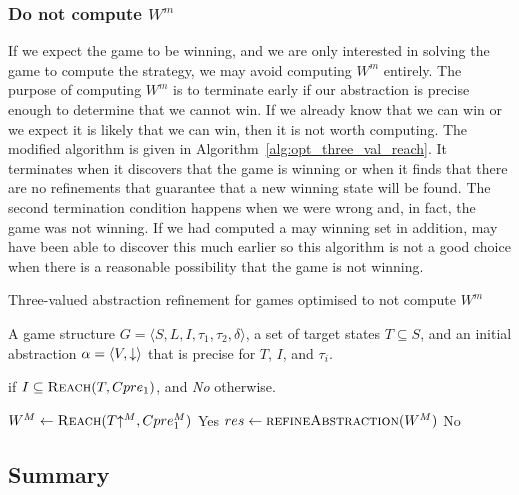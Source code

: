 \subsubsection{Do not compute $W^m$}

If we expect the game to be winning, and we are only interested in solving the game to compute the strategy, we may avoid computing $W^m$ entirely. The purpose of computing $W^m$ is to terminate early if our abstraction is precise enough to determine that we cannot win. If we already know that we can win or we expect it is likely that we can win, then it is not worth computing. The modified algorithm is given in Algorithm~\ref{alg:opt_three_val_reach}. It terminates when it discovers that the game is winning or when it finds that there are no refinements that guarantee that a new winning state will be found. The second termination condition happens when we were wrong and, in fact, the game was not winning. If we had computed a may winning set in addition, may have been able to discover this much earlier so this algorithm is not a good choice when there is a reasonable possibility that the game is not winning.

\begin{algorithm}
\caption{Three-valued abstraction refinement for games optimised to not compute $W^m$}
\label{alg:opt_three_val_reach}

\begin{algorithmic}[1]

\Require A game structure $G = \langle S, L, I, \tau_1, \tau_2, \delta \rangle$, a set 
of target states $T\subseteq S$, and an initial abstraction $\alpha=\langle V, \mathord{\downarrow} \rangle$
that is precise for $T$, $I$, and $\tau_i$.

 if $I \subseteq \textsc{Reach}(T, Cpre_1)$, and {\it No} otherwise.


    \Loop
        \State $W^M \gets \textsc{Reach}(T\mathord{\uparrow^M}, Cpre_1^M)$
            \State\Return Yes
        \Else       
            \State $res \gets \Call{refineAbstraction}{W^M}$
                \State\Return No
            \EndIf
        \EndIf
    \EndLoop
\EndFunction

\end{algorithmic}
\end{algorithm}

\subsection{Summary}

